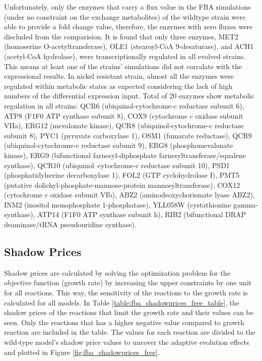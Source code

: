 Unfortunately, only the enzymes that carry a flux value in the FBA simulations (under no constraint on the exchange metabolites) of the wildtype strain were able to provide a fold change value, therefore, the enzymes with zero fluxes were discluded from the comparision. It is found that only three enzymes, MET2 (homoserine O-acetyltransferase), OLE1 (stearoyl-CoA 9-desaturase), and ACH1 (acetyl-CoA hydrolase), were transcriptionally regulated in all evolved strains. This means at least one of the strains' simulations did not corralate with the expressional results. In nickel resistant strain, almost all the enzymes were regulated within metabolic states as expected considering the lack of high numbers of the differential expression input. Total of 20 enzymes show metabolic regulation in all strains: QCR6 (ubiquinol-cytochrome-c reductase subunit 6), ATP8 (F1F0 ATP synthase subunit 8), COX9 (cytochrome c oxidase subunit VIIa), ERG12 (mevalonate kinase), QCR8 (ubiquinol-cytochrome-c reductase subunit 8), PYC1 (pyruvate carboxylase 1), OSM1 (fumarate reductase), QCR9 (ubiquinol-cytochrome-c reductase subunit 9), ERG8 (phosphomevalonate kinase), ERG9 (bifunctional farnesyl-diphosphate farnesyltransferase/squalene synthase), QCR10 (ubiquinol--cytochrome-c reductase subunit 10), PSD1 (phosphatidylserine decarboxylase 1), FOL2 (GTP cyclohydrolase I), PMT5 (putative dolichyl-phosphate-mannose-protein mannosyltransferase), COX12 (cytochrome c oxidase subunit VIb), ABZ2 (aminodeoxychorismate lyase ABZ2), INM2 (inositol monophosphate 1-phosphatase), YLL058W (cystathionine gamma-synthase), ATP14 (F1F0 ATP synthase subunit h), RIB2 (bifunctional DRAP deaminase/tRNA pseudouridine synthase).

\subsection{Shadow Prices}
Shadow prices are calculated by solving the optimization problem for the objective function (growth rate) by increasing the upper constraints by one unit for all reactions. This way, the sensitivity of the reactions to the growth rate is calculated for all models. In Table \ref{table:fba_shadowprices_free_table}, the shadow prices of the reactions that limit the growth rate and their values can be seen. Only the reactions that has a higher negative value compared to growth reaction are included in the table. The values for each reaction are divided to the wild-type model's shadow price values to uncover the adaptive evolution effects and plotted in Figure \ref{fig:fba_shadowprices_free}.

